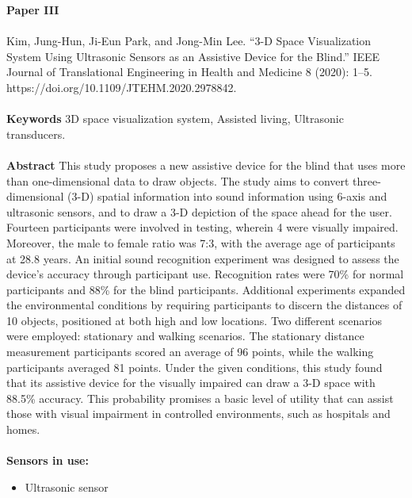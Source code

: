 
\textbf{Paper III} 
\\ \\
\noindent
Kim, Jung-Hun, Ji-Eun Park, and Jong-Min Lee. “3-D Space Visualization System Using Ultrasonic Sensors as an Assistive Device for the Blind.” IEEE Journal of Translational Engineering in Health and Medicine 8 (2020): 1–5. https://doi.org/10.1109/JTEHM.2020.2978842. \\ \\

\noindent
\textbf{Keywords} 3D space visualization system, Assisted living, Ultrasonic transducers. \\ \\

\noindent
\textbf{Abstract} This study proposes a new assistive device for the blind that uses more than one-dimensional data to draw objects. The study aims to convert three-dimensional (3-D) spatial information into sound information using 6-axis and ultrasonic sensors, and to draw a 3-D depiction of the space ahead for the user. Fourteen participants were involved in testing, wherein 4 were visually impaired. Moreover, the male to female ratio was 7:3, with the average age of participants at 28.8 years. An initial sound recognition experiment was designed to assess the device's accuracy through participant use. Recognition rates were 70\% for normal participants and 88\% for the blind participants. Additional experiments expanded the environmental conditions by requiring participants to discern the distances of 10 objects, positioned at both high and low locations. Two different scenarios were employed: stationary and walking scenarios. The stationary distance measurement participants scored an average of 96 points, while the walking participants averaged 81 points. Under the given conditions, this study found that its assistive device for the visually impaired can draw a 3-D space with 88.5\% accuracy. This probability promises a basic level of utility that can assist those with visual impairment in controlled environments, such as hospitals and homes. \\ \\

\noindent
\textbf{Sensors in use:}
\begin{itemize}
    \item Ultrasonic sensor \\ \\
\end{itemize}

